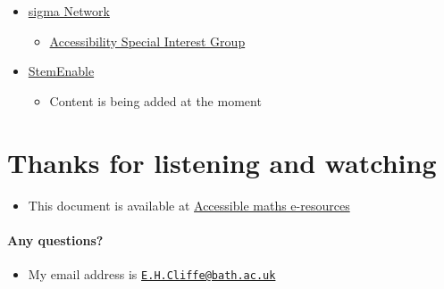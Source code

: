 \documentclass[
  17pt,
  english,
  a4paper]{extarticle}
\providecommand{\tightlist}{%
  \setlength{\itemsep}{0pt}\setlength{\parskip}{0pt}}
\theoremstyle{plain}
\theoremstyle{plain}
\theoremstyle{plain}
\theoremstyle{plain}
\theoremstyle{plain}
\theoremstyle{definition}
\theoremstyle{definition}
\theoremstyle{definition}
\theoremstyle{remark}
\renewcommand{\;}{\,}
\begin{document}
\begin{itemize}
\tightlist
\item
  \href{http://www.sigma-network.ac.uk/}{sigma Network}

  \begin{itemize}
  \tightlist
  \item
    \href{http://www.sigma-network.ac.uk/sigs/accessibility-sig/}{Accessibility Special Interest Group}
  \end{itemize}
\item
  \href{http://www.stem-enable.org.uk}{StemEnable}

  \begin{itemize}
  \tightlist
  \item
    Content is being added at the moment
  \end{itemize}
\end{itemize}

\hypertarget{thanks-for-listening-and-watching}{%
\section{Thanks for listening and watching}\label{thanks-for-listening-and-watching}}

\begin{itemize}
\tightlist
\item
  This document is available at \href{https://stem-enable.github.io/Accessibility-of-maths-e-resources/index.html}{Accessible maths e-resources}
\end{itemize}

\hypertarget{any-questions}{%
\paragraph{Any questions?}\label{any-questions}}

\begin{itemize}
\tightlist
\item
  My email address is \href{mailto:E.H.Cliffe@bath.ac.uk}{\nolinkurl{E.H.Cliffe@bath.ac.uk}}
\end{itemize}
\end{document}
